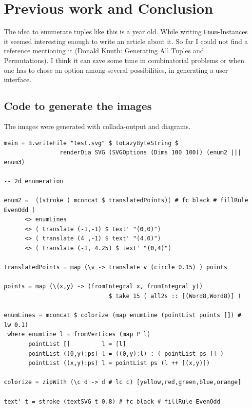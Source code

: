 \documentclass{tmr}
\begin{document}
\section{Previous work and Conclusion}
The idea to enumerate tuples like this is a year old. While writing \verb|Enum|-Instances it seemed interesting enough to write an article about it. So far I could not find a reference mentioning it (\eg Donald Knuth: Generating All Tuples and Permutations). I think it can save some time in combinatorial problems or when one has to chose an option among several possibilities, \eg in generating a user interface.

\subsection{Code to generate the images}

The images were generated with collada-output and diagrams.

\begin{verbatim}
main = B.writeFile "test.svg" $ toLazyByteString $
                renderDia SVG (SVGOptions (Dims 100 100)) (enum2 ||| enum3)

-- 2d enumeration

enum2 =  ((stroke ( mconcat $ translatedPoints)) # fc black # fillRule EvenOdd )
      <> enumLines
      <> ( translate (-1,-1) $ text' "(0,0)")
      <> ( translate (4 ,-1) $ text' "(4,0)")
      <> ( translate (-1, 4.25) $ text' "(0,4)")

translatedPoints = map (\v -> translate v (circle 0.15) ) points

points = map (\(x,y) -> (fromIntegral x, fromIntegral y))
                              $ take 15 ( all2s :: [(Word8,Word8)] )

enumLines = mconcat $ colorize (map enumLine (pointList points []) # lw 0.1)
 where enumLine l = fromVertices (map P l)
       pointList []         l = [l]
       pointList ((0,y):ps) l = ((0,y):l) : ( pointList ps [] )
       pointList ((x,y):ps) l = pointList ps (l ++ [(x,y)])

colorize = zipWith (\c d -> d # lc c) [yellow,red,green,blue,orange]

text' t = stroke (textSVG t 0.8) # fc black # fillRule EvenOdd
\end{verbatim}
\end{document}
